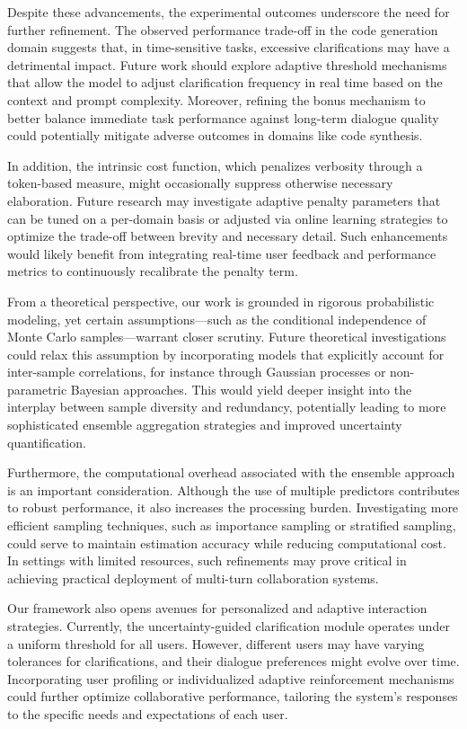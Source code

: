 \documentclass{article}
\begin{document}
Despite these advancements, the experimental outcomes underscore the need for further refinement. The observed performance trade-off in the code generation domain suggests that, in time-sensitive tasks, excessive clarifications may have a detrimental impact. Future work should explore adaptive threshold mechanisms that allow the model to adjust clarification frequency in real time based on the context and prompt complexity. Moreover, refining the bonus mechanism to better balance immediate task performance against long-term dialogue quality could potentially mitigate adverse outcomes in domains like code synthesis.

In addition, the intrinsic cost function, which penalizes verbosity through a token-based measure, might occasionally suppress otherwise necessary elaboration. Future research may investigate adaptive penalty parameters that can be tuned on a per-domain basis or adjusted via online learning strategies to optimize the trade-off between brevity and necessary detail. Such enhancements would likely benefit from integrating real-time user feedback and performance metrics to continuously recalibrate the penalty term.

From a theoretical perspective, our work is grounded in rigorous probabilistic modeling, yet certain assumptions—such as the conditional independence of Monte Carlo samples—warrant closer scrutiny. Future theoretical investigations could relax this assumption by incorporating models that explicitly account for inter-sample correlations, for instance through Gaussian processes or non-parametric Bayesian approaches. This would yield deeper insight into the interplay between sample diversity and redundancy, potentially leading to more sophisticated ensemble aggregation strategies and improved uncertainty quantification.

Furthermore, the computational overhead associated with the ensemble approach is an important consideration. Although the use of multiple predictors contributes to robust performance, it also increases the processing burden. Investigating more efficient sampling techniques, such as importance sampling or stratified sampling, could serve to maintain estimation accuracy while reducing computational cost. In settings with limited resources, such refinements may prove critical in achieving practical deployment of multi-turn collaboration systems.

Our framework also opens avenues for personalized and adaptive interaction strategies. Currently, the uncertainty-guided clarification module operates under a uniform threshold for all users. However, different users may have varying tolerances for clarifications, and their dialogue preferences might evolve over time. Incorporating user profiling or individualized adaptive reinforcement mechanisms could further optimize collaborative performance, tailoring the system's responses to the specific needs and expectations of each user.
\end{document}
